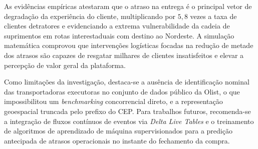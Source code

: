 \documentclass[10pt,a4paper,twocolumn]{article}
\begin{document}
As evidências empíricas atestaram que o atraso na entrega é o principal vetor de degradação da experiência do cliente, multiplicando por $5,8$ vezes a taxa de clientes detratores e evidenciando a extrema vulnerabilidade da cadeia de suprimentos em rotas interestaduais com destino ao Nordeste. A simulação matemática comprovou que intervenções logísticas focadas na redução de metade dos atrasos são capazes de resgatar milhares de clientes insatisfeitos e elevar a percepção de valor geral da plataforma.

Como limitações da investigação, destaca-se a ausência de identificação nominal das transportadoras executoras no conjunto de dados público da Olist, o que impossibilitou um \textit{benchmarking} concorrencial direto, e a representação geoespacial truncada pelo prefixo do CEP. Para trabalhos futuros, recomenda-se a integração de fluxos contínuos de eventos via \textit{Delta Live Tables} e o treinamento de algoritmos de aprendizado de máquina supervisionados para a predição antecipada de atrasos operacionais no instante do fechamento da compra.

\begingroup
\small
\setlength{\bibsep}{2.0pt plus 0.5pt}


\endgroup
\end{document}
